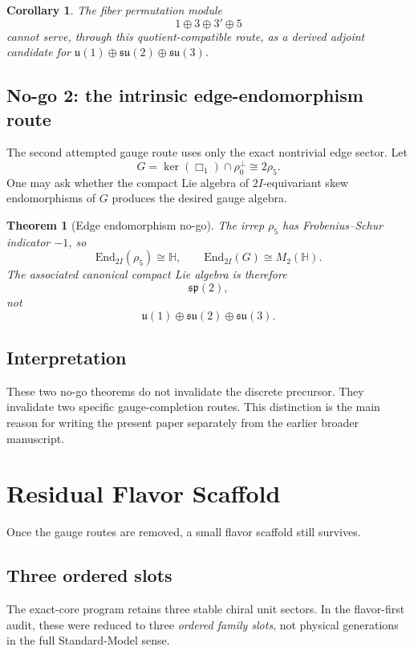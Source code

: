 \documentclass[12pt,a4paper]{article}
\newtheorem{theorem}{Theorem}
\newtheorem{corollary}{Corollary}
\theoremstyle{definition}
\begin{document}
\begin{corollary}
The fiber permutation module
\[
1 \oplus 3 \oplus 3' \oplus 5
\]
cannot serve, through this quotient-compatible route, as a derived adjoint
candidate for
\(\mathfrak{u}(1)\oplus\mathfrak{su}(2)\oplus\mathfrak{su}(3)\).
\end{corollary}

\subsection{No-go 2: the intrinsic edge-endomorphism route}

The second attempted gauge route uses only the exact nontrivial edge sector.
Let
\[
G = \ker(\Box_1)\cap \rho_0^\perp \cong 2\rho_5.
\]
One may ask whether the compact Lie algebra of \(2I\)-equivariant skew
endomorphisms of \(G\) produces the desired gauge algebra.

\begin{theorem}[Edge endomorphism no-go]
The irrep \(\rho_5\) has Frobenius--Schur indicator \(-1\), so
\[
\mathrm{End}_{2I}(\rho_5)\cong \mathbb{H},
\qquad
\mathrm{End}_{2I}(G)\cong M_2(\mathbb{H}).
\]
The associated canonical compact Lie algebra is therefore
\[
\mathfrak{sp}(2),
\]
not
\[
\mathfrak{u}(1)\oplus\mathfrak{su}(2)\oplus\mathfrak{su}(3).
\]
\end{theorem}

\subsection{Interpretation}

These two no-go theorems do not invalidate the discrete precursor. They
invalidate two specific gauge-completion routes. This distinction is the main
reason for writing the present paper separately from the earlier broader
manuscript.

\section{Residual Flavor Scaffold}

Once the gauge routes are removed, a small flavor scaffold still survives.

\subsection{Three ordered slots}

The exact-core program retains three stable chiral unit sectors. In the
flavor-first audit, these were reduced to three \emph{ordered family slots},
not physical generations in the full Standard-Model sense.
\end{document}
